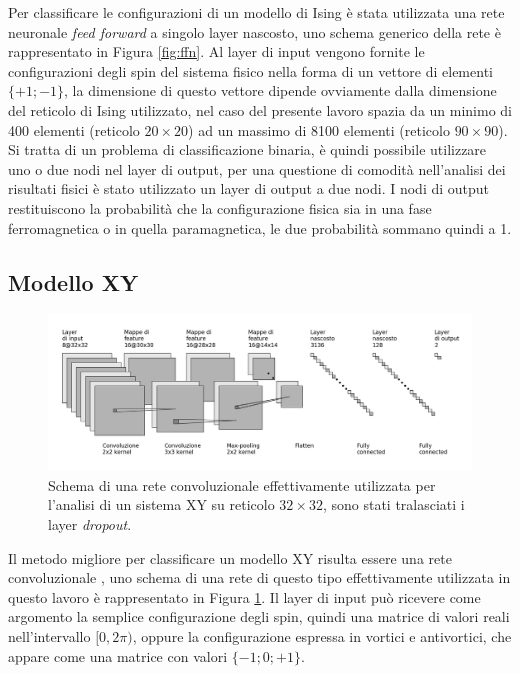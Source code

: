 \documentclass{article}
\begin{document}
Per classificare le configurazioni di un modello di Ising è stata utilizzata una rete neuronale \emph{feed forward} a singolo layer nascosto, uno schema generico della rete è rappresentato in Figura \ref{fig:ffn}.
Al layer di input vengono fornite le configurazioni degli spin del sistema fisico nella forma di un vettore di elementi $\{+1;-1\}$, la dimensione di questo vettore dipende ovviamente dalla dimensione del reticolo di Ising utilizzato, nel caso del presente lavoro spazia da un minimo di 400 elementi (reticolo $20\times20$) ad un massimo di 8100 elementi (reticolo $90\times90$).
Si tratta di un problema di classificazione binaria, è quindi possibile utilizzare uno o due nodi nel layer di output, per una questione di comodità nell'analisi dei risultati fisici è stato utilizzato un layer di output a due nodi.
I nodi di output restituiscono la probabilità che la configurazione fisica sia in una fase ferromagnetica o in quella paramagnetica, le due probabilità sommano quindi a 1.

\subsection{Modello XY}

\begin{figure}
 \centerline{\includegraphics[scale=0.35]{cnn.png}}
 \label{fig:cnn}
 \caption{Schema di una rete convoluzionale effettivamente utilizzata per l'analisi di un sistema XY su reticolo $32\times32$, sono stati tralasciati i layer \emph{dropout}.}
\end{figure}

Il metodo migliore per classificare un modello XY risulta essere una rete convoluzionale \cite{melko}, uno schema di una rete di questo tipo effettivamente utilizzata in questo lavoro è rappresentato in Figura \ref{fig:cnn}.
Il layer di input può ricevere come argomento la semplice configurazione degli spin, quindi una matrice di valori reali nell'intervallo $[0,2\pi)$, oppure la configurazione espressa in vortici e antivortici, che appare come una matrice con valori $\{-1;0;+1\}$.
\end{document}
